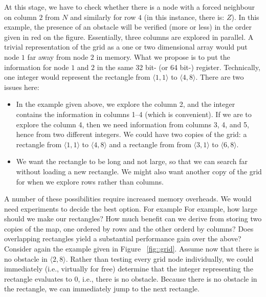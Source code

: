 At this stage, we have to check 
whether there is a node with a forced neighbour on column $2$ from $N$ 
and similarly for row $4$ (in this instance, there is: $Z$).  
In this example, the presence of an obstacle 
will be verified (more or less) in the order given in red on the figure.  
Essentially, three columns are explored in parallel.  
A trivial representation of the grid as a one or two dimensional array
would put node $1$ far away from node $2$ in memory.  
What we propose is to put the information for node $1$ and $2$ 
in the same 32 bit- (or 64 bit-) register.  
Technically, one integer would represent the rectangle 
from $\langle 1,1\rangle$ to $\langle 4,8\rangle$.  
There are two issues here: 
\begin{itemize}
\item 
  In the example given above, we explore the column 2, 
  and the integer contains the information in columns 1--4 
  (which is convenient).  
  If we are to explore the column 4, 
  then we need information from columns 3, 4, and 5, 
  hence from two different integers.  
  We could have two copies of the grid: 
  a rectangle from $\langle 1,1\rangle$ to $\langle 4,8\rangle$ 
  and a rectangle from from $\langle 3,1\rangle$ to $\langle 6,8\rangle$.  
\item 
  We want the rectangle to be long and not large, 
  so that we can search far without loading a new rectangle.  
  We might also want another copy of the grid for when we explore rows
  rather than columns.
\end{itemize}
A number of these possibilities require increased memory overheads. 
We would need experiments to decide the best option. For example
For example, how large should we make our rectangles? How much benefit can we
derive from storing two copies of the map, one ordered by rows and the other
orderd by columns? Does overlapping rectangles yield a substantial
performance gain over the above?
Consider again the example given in Figure  ~\ref{fig::grid}.  
Assume now that there is no obstacle in $\langle 2,8\rangle$.  
Rather than testing every grid node individually, 
we could immediately (i.e., virtually for free) determine 
that the integer representing the rectangle 
evaluates to $0$, i.e., there is no obstacle.  
Because there is no obstacle in the rectangle, 
we can immediately jump to the next rectangle.  

